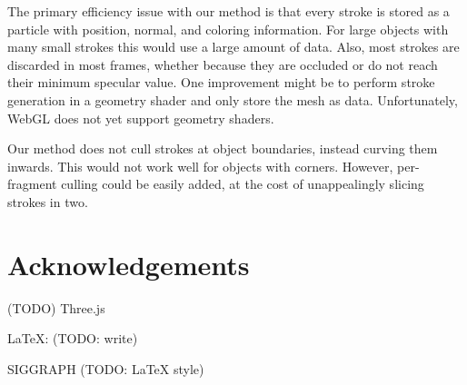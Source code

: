 \documentclass[conference]{acmsiggraph}
\begin{document}
The primary efficiency issue with our method is that every stroke is stored as
a particle with position, normal, and coloring information. For large objects
with many small strokes this would use a large amount of data. Also, most
strokes are discarded in most frames, whether because they are occluded or do
not reach their minimum specular value. One improvement might be to perform
stroke generation in a geometry shader and only store the mesh as data.
Unfortunately, WebGL does not yet support geometry shaders.

Our method does not cull strokes at object boundaries, instead curving them
inwards. This would not work well for objects with corners. However,
per-fragment culling could be easily added, at the cost of unappealingly
slicing strokes in two.


\section*{Acknowledgements}

(TODO) Three.js

\LaTeX : (TODO: write)

SIGGRAPH (TODO: LaTeX style)




\end{document}
